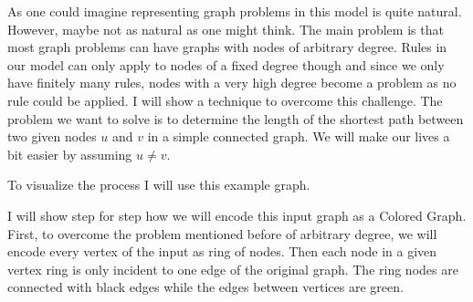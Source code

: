 As one could imagine representing graph problems in this model is quite natural.
However, maybe not as natural as one might think.
The main problem is that most graph problems can have graphs with nodes of arbitrary degree.
Rules in our model can only apply to nodes of a fixed degree though and since we only have finitely many rules, nodes with a very high degree become a problem as no rule could be applied.
I will show a technique to overcome this challenge.
The problem we want to solve is to determine the length of the shortest path between two given nodes $u$ and $v$ in a simple connected graph.
We will make our lives a bit easier by assuming $u \ne v$.

To visualize the process I will use this example graph.

\begin{center}
\end{center}

I will show step for step how we will encode this input graph as a Colored Graph.
First, to overcome the problem mentioned before of arbitrary degree, we will encode every vertex of the input as ring of nodes.
Then each node in a given vertex ring is only incident to one edge of the original graph.
The ring nodes are connected with black edges while the edges between vertices are green.

